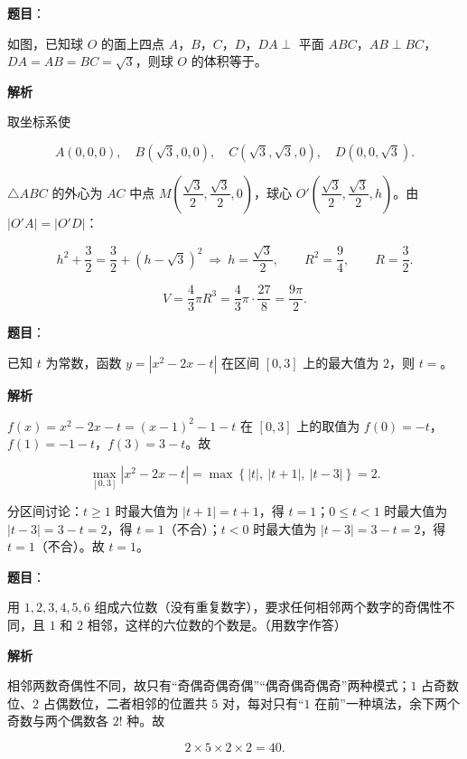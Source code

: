 \begin{answer}

\textbf{题目}：

如图，已知球 $O$ 的面上四点 $A$，$B$，$C$，$D$，$DA\perp$ 平面 $ABC$，$AB\perp BC$，$DA=AB=BC=\sqrt3$，则球 $O$ 的体积等于\gkblank{}。
\nopagebreak[4]
\begin{center}\end{center}
\nopagebreak[4]
\textbf{解析}

取坐标系使

\nopagebreak[4]
\[A(0,0,0),\quad B(\sqrt3,0,0),\quad C(\sqrt3,\sqrt3,0),\quad D(0,0,\sqrt3).\]

$\triangle ABC$ 的外心为 $AC$ 中点 $M\left(\dfrac{\sqrt3}2,\dfrac{\sqrt3}2,0\right)$，球心 $O'\left(\dfrac{\sqrt3}2,\dfrac{\sqrt3}2,h\right)$。由 $|O'A|=|O'D|$：

\nopagebreak[4]
\[h^2+\frac32=\frac32+\left(h-\sqrt3\right)^2\ \Longrightarrow\ h=\frac{\sqrt3}2,\qquad R^2=\frac94,\qquad R=\frac32.\]

\nopagebreak[4]
\[V=\frac43\pi R^3=\frac43\pi\cdot\frac{27}8=\frac{9\pi}2.\]


\end{answer}
\begin{answer}

\textbf{题目}：

已知 $t$ 为常数，函数 $y=\left|x^2-2x-t\right|$ 在区间 $[0,3]$ 上的最大值为 $2$，则 $t=$\gkblank{}。

\textbf{解析}

$f(x)=x^2-2x-t=(x-1)^2-1-t$ 在 $[0,3]$ 上的取值为 $f(0)=-t$，$f(1)=-1-t$，$f(3)=3-t$。故

\nopagebreak[4]
\[\max_{[0,3]}\left|x^2-2x-t\right|=\max\left\{|t|,\ |t+1|,\ |t-3|\right\}=2.\]

分区间讨论：$t\geqslant1$ 时最大值为 $|t+1|=t+1$，得 $t=1$；$0\leqslant t<1$ 时最大值为 $|t-3|=3-t=2$，得 $t=1$（不合）；$t<0$ 时最大值为 $|t-3|=3-t=2$，得 $t=1$（不合）。故 $t=1$。


\end{answer}
\begin{answer}

\textbf{题目}：

用 $1,2,3,4,5,6$ 组成六位数（没有重复数字），要求任何相邻两个数字的奇偶性不同，且 $1$ 和 $2$ 相邻，这样的六位数的个数是\gkblank{}。（用数字作答）

\textbf{解析}

相邻两数奇偶性不同，故只有“奇偶奇偶奇偶”“偶奇偶奇偶奇”两种模式；$1$ 占奇数位、$2$ 占偶数位，二者相邻的位置共 $5$ 对，每对只有“$1$ 在前”一种填法，余下两个奇数与两个偶数各 $2!$ 种。故

\nopagebreak[4]
\[2\times5\times2\times2=40.\]


\end{answer}

